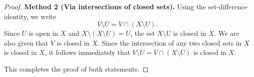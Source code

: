 \begin{proof}
\textbf{Method 2 (Via intersections of closed sets).} Using the set-difference identity, we
write
\[ V\setminus U=V\cap(X\setminus U). \]
Since $U$ is open in $X$ and $X\setminus(X\setminus U)=U$, the set $X\setminus U$ is closed in
$X$. We are also given that $V$ is closed in $X$. Since the intersection of any two closed sets
in $X$ is closed in $X$, it follows immediately that $V\setminus U=V\cap(X\setminus U)$ is
closed in $X$.

This completes the proof of both statements.
\end{proof}
